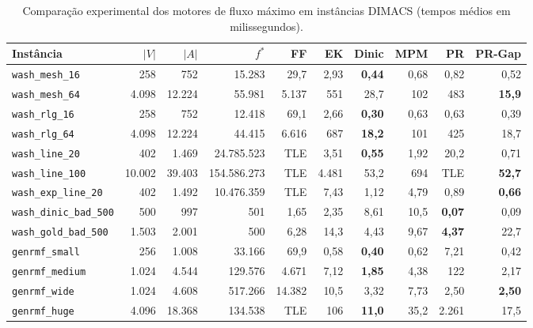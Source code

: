 \begin{table}[!ht]
\centering
\small
\setlength{\tabcolsep}{3.5pt}
\begin{tabular}{lrrrrrrrrr}
\toprule
\textbf{Instância} & $|V|$ & $|A|$ & $f^*$ & \textbf{FF} & \textbf{EK} & \textbf{Dinic} & \textbf{MPM} & \textbf{PR} & \textbf{PR-Gap} \\
\midrule
\texttt{wash\_mesh\_16} & 258 & 752 & 15.283 & 29,7 & 2,93 & \textbf{0,44} & 0,68 & 0,82 & 0,52 \\
\texttt{wash\_mesh\_64} & 4.098 & 12.224 & 55.981 & 5.137 & 551 & 28,7 & 102 & 483 & \textbf{15,9} \\
\texttt{wash\_rlg\_16} & 258 & 752 & 12.418 & 69,1 & 2,66 & \textbf{0,30} & 0,63 & 0,63 & 0,39 \\
\texttt{wash\_rlg\_64} & 4.098 & 12.224 & 44.415 & 6.616 & 687 & \textbf{18,2} & 101 & 425 & 18,7 \\
\texttt{wash\_line\_20} & 402 & 1.469 & 24.785.523 & TLE & 3,51 & \textbf{0,55} & 1,92 & 20,2 & 0,71 \\
\texttt{wash\_line\_100} & 10.002 & 39.403 & 154.586.273 & TLE & 4.481 & 53,2 & 694 & TLE & \textbf{52,7} \\
\texttt{wash\_exp\_line\_20} & 402 & 1.492 & 10.476.359 & TLE & 7,43 & 1,12 & 4,79 & 0,89 & \textbf{0,66} \\
\texttt{wash\_dinic\_bad\_500} & 500 & 997 & 501 & 1,65 & 2,35 & 8,61 & 10,5 & \textbf{0,07} & 0,09 \\
\texttt{wash\_gold\_bad\_500} & 1.503 & 2.001 & 500 & 6,28 & 14,3 & 4,43 & 9,67 & \textbf{4,37} & 22,7 \\
\texttt{genrmf\_small} & 256 & 1.008 & 33.166 & 69,9 & 0,58 & \textbf{0,40} & 0,62 & 7,21 & 0,42 \\
\texttt{genrmf\_medium} & 1.024 & 4.544 & 129.576 & 4.671 & 7,12 & \textbf{1,85} & 4,38 & 122 & 2,17 \\
\texttt{genrmf\_wide} & 1.024 & 4.608 & 517.266 & 14.382 & 10,5 & 3,32 & 7,73 & 2,50 & \textbf{2,50} \\
\texttt{genrmf\_huge} & 4.096 & 18.368 & 134.538 & TLE & 106 & \textbf{11,0} & 35,2 & 2.261 & 17,5 \\
\bottomrule
\end{tabular}
\caption{Comparação experimental dos motores de fluxo máximo em instâncias DIMACS (tempos médios em milissegundos).}
\label{tab:benchmarks_maxflow}
\end{table}
